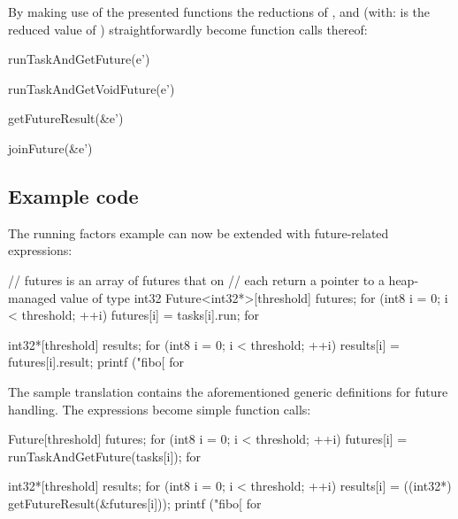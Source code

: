By making use of the presented functions the reductions of ,  and  (with:  is the reduced value of ) straightforwardly become function calls thereof:

\begin{minipage}{0.5\textwidth}
\begin{ccode}
runTaskAndGetFuture(e')
\end{ccode}
\end{minipage}
\begin{minipage}{0.5\textwidth}
\begin{ccode}
runTaskAndGetVoidFuture(e')
\end{ccode}
\end{minipage}

\begin{minipage}{0.5\textwidth}
\begin{ccode}
getFutureResult(&e')
\end{ccode}
\end{minipage}
\begin{minipage}{0.5\textwidth}
\begin{ccode}
joinFuture(&e')
\end{ccode}
\end{minipage}

\subsection{Example code}
The running factors example can now be extended with future-related expressions:
\begin{ccode}
// futures is an array of futures that on 
// each return a pointer to a heap-managed value of type int32
Future<int32*>[threshold] futures; 
for (int8 i = 0; i < threshold; ++i) { 
  futures[i] = tasks[i].run; 
} for 
 
int32*[threshold] results; 
for (int8 i = 0; i < threshold; ++i) { 
  results[i] = futures[i].result; 
  printf ("fibo[%
} for
\end{ccode}

The sample translation contains the aforementioned generic definitions for future handling. The expressions become simple function calls:
\begin{ccode}
Future[threshold] futures; 
for (int8 i = 0; i < threshold; ++i) { 
  futures[i] = runTaskAndGetFuture(tasks[i]); 
} for 
 
int32*[threshold] results; 
for (int8 i = 0; i < threshold; ++i) { 
  results[i] = ((int32*) getFutureResult(&futures[i])); 
  printf ("fibo[%
} for
\end{ccode}